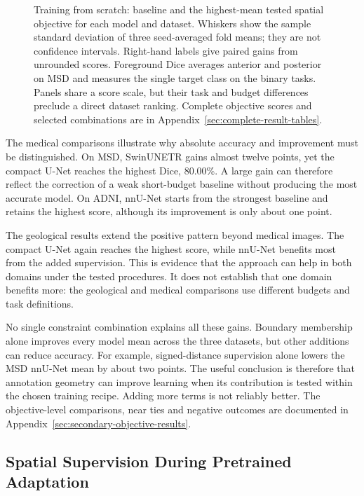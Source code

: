 \documentclass[12pt,a4paper]{article}
\begin{document}
\begin{figure}[htbp]
\caption{Training from scratch: baseline and the highest-mean tested
spatial objective for each model and dataset. Whiskers show the sample
standard deviation of three seed-averaged fold means; they are not
confidence intervals. Right-hand labels give paired gains from unrounded
scores. Foreground Dice averages anterior and posterior on MSD and measures
the single target class on the binary tasks. Panels share a score scale,
but their task and budget differences preclude a direct dataset ranking.
Complete objective scores and selected combinations are in
Appendix~\ref{sec:complete-result-tables}.}
\label{fig:scratch-key-results}
\label{fig:geo-key-results}\label{fig:msd-key-results}\label{fig:adni-key-results}
\end{figure}

The medical comparisons illustrate why absolute accuracy and improvement
must be distinguished. On MSD, SwinUNETR gains almost twelve points, yet
the compact U-Net reaches the highest Dice, 80.00\%. A large gain can
therefore reflect the correction of a weak short-budget baseline without
producing the most accurate model. On ADNI, nnU-Net starts from the
strongest baseline and retains the highest score, although its improvement
is only about one point.

The geological results extend the positive pattern beyond medical images.
The compact U-Net again reaches the highest score, while nnU-Net benefits
most from the added supervision. This is evidence that the approach can
help in both domains under the tested procedures. It does not establish
that one domain benefits more: the geological and medical comparisons
use different budgets and task definitions.

No single constraint combination explains all these gains. Boundary
membership alone improves every model mean across the three datasets,
but other additions can reduce accuracy. For example, signed-distance
supervision alone lowers the MSD nnU-Net mean by about two points.
The useful conclusion is therefore that annotation geometry can improve
learning when its contribution is tested within the chosen training
recipe. Adding more terms is not reliably better. The objective-level
comparisons, near ties and negative outcomes are documented in
Appendix~\ref{sec:secondary-objective-results}.

\FloatBarrier
\subsection{Spatial Supervision During Pretrained Adaptation}
\label{sec:sam3-results}\label{sec:medsam-results}\label{sec:medsam-adni-results}
\end{document}
